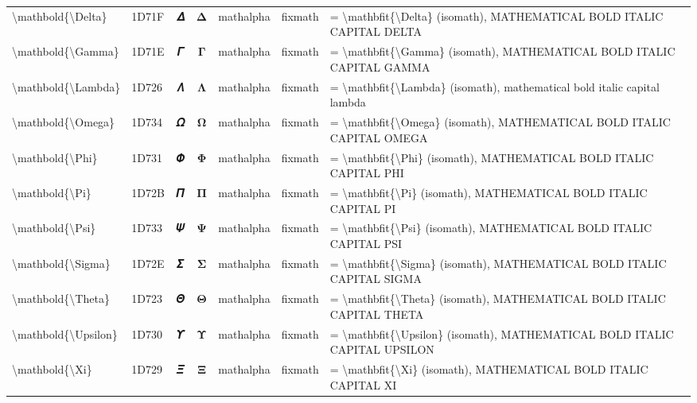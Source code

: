 \documentclass[a4paper,landscape]{article}
\begin{document}
\begin{longtable}{llcclll}
\textbackslash{}mathbold\{\textbackslash{}Delta\} & 1D71F & 𝜟 & $\mathbold{\Delta}$ & mathalpha & fixmath & = \textbackslash{}mathbfit\{\textbackslash{}Delta\} (isomath),  MATHEMATICAL BOLD ITALIC CAPITAL DELTA \\
\textbackslash{}mathbold\{\textbackslash{}Gamma\} & 1D71E & 𝜞 & $\mathbold{\Gamma}$ & mathalpha & fixmath & = \textbackslash{}mathbfit\{\textbackslash{}Gamma\} (isomath),  MATHEMATICAL BOLD ITALIC CAPITAL GAMMA \\
\textbackslash{}mathbold\{\textbackslash{}Lambda\} & 1D726 & 𝜦 & $\mathbold{\Lambda}$ & mathalpha & fixmath & = \textbackslash{}mathbfit\{\textbackslash{}Lambda\} (isomath),  mathematical bold italic capital lambda \\
\textbackslash{}mathbold\{\textbackslash{}Omega\} & 1D734 & 𝜴 & $\mathbold{\Omega}$ & mathalpha & fixmath & = \textbackslash{}mathbfit\{\textbackslash{}Omega\} (isomath),  MATHEMATICAL BOLD ITALIC CAPITAL OMEGA \\
\textbackslash{}mathbold\{\textbackslash{}Phi\} & 1D731 & 𝜱 & $\mathbold{\Phi}$ & mathalpha & fixmath & = \textbackslash{}mathbfit\{\textbackslash{}Phi\} (isomath),  MATHEMATICAL BOLD ITALIC CAPITAL PHI \\
\textbackslash{}mathbold\{\textbackslash{}Pi\} & 1D72B & 𝜫 & $\mathbold{\Pi}$ & mathalpha & fixmath & = \textbackslash{}mathbfit\{\textbackslash{}Pi\} (isomath),  MATHEMATICAL BOLD ITALIC CAPITAL PI \\
\textbackslash{}mathbold\{\textbackslash{}Psi\} & 1D733 & 𝜳 & $\mathbold{\Psi}$ & mathalpha & fixmath & = \textbackslash{}mathbfit\{\textbackslash{}Psi\} (isomath),  MATHEMATICAL BOLD ITALIC CAPITAL PSI \\
\textbackslash{}mathbold\{\textbackslash{}Sigma\} & 1D72E & 𝜮 & $\mathbold{\Sigma}$ & mathalpha & fixmath & = \textbackslash{}mathbfit\{\textbackslash{}Sigma\} (isomath),  MATHEMATICAL BOLD ITALIC CAPITAL SIGMA \\
\textbackslash{}mathbold\{\textbackslash{}Theta\} & 1D723 & 𝜣 & $\mathbold{\Theta}$ & mathalpha & fixmath & = \textbackslash{}mathbfit\{\textbackslash{}Theta\} (isomath),  MATHEMATICAL BOLD ITALIC CAPITAL THETA \\
\textbackslash{}mathbold\{\textbackslash{}Upsilon\} & 1D730 & 𝜰 & $\mathbold{\Upsilon}$ & mathalpha & fixmath & = \textbackslash{}mathbfit\{\textbackslash{}Upsilon\} (isomath),  MATHEMATICAL BOLD ITALIC CAPITAL UPSILON \\
\textbackslash{}mathbold\{\textbackslash{}Xi\} & 1D729 & 𝜩 & $\mathbold{\Xi}$ & mathalpha & fixmath & = \textbackslash{}mathbfit\{\textbackslash{}Xi\} (isomath),  MATHEMATICAL BOLD ITALIC CAPITAL XI \\

\end{longtable}
\end{document}
